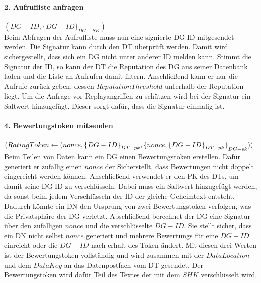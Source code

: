 \documentclass[
	fontsize=11pt,
	headings=small,
	parskip=half,           %
	bibliography=totoc,
	numbers=noenddot,       %
	open=any,               %
]{scrreprt}
\begin{document}
\paragraph{2. Aufrufliste anfragen} $(DG-ID, {\{DG-ID\}}_{DG-SK})$\\
Beim Abfragen der Aufrufliste muss nun eine signierte DG ID mitgesendet werden. Die Signatur kann durch den DT überprüft werden. Damit wird sichergestellt, dass sich ein DG nicht unter anderer ID melden kann. Stimmt die Signatur der ID, so kann der DT die Reputation des DG aus seiner Datenbank laden und die Liste an Aufrufen damit filtern. Anschließend kann er nur die Aufrufe zurück geben, dessen $ReputationThreshold$ unterhalb der Reputation liegt. Um die Anfrage vor Replayangriffen zu schützen wird bei der Signatur ein Saltwert hinzugefügt. Dieser sorgt dafür, dass die Signatur einmalig ist.

\paragraph{4. Bewertungstoken mitsenden}$(RatingToken \leftarrow (nonce, {\{DG-ID\}}_{DT-pk},\\{\{nonce, {\{DG-ID\}}_{DT-pk}\}}_{DG-sk}))$\\
Beim Teilen von Daten kann ein DG einen Bewertungstoken erstellen. Dafür generiert er zufällig einen $nonce$ der Sicherstellt, dass Bewertungen nicht doppelt eingereicht werden können. Anschließend verwendet er den PK des DTs, um damit seine DG ID zu verschlüsseln. Dabei muss ein Saltwert hinzugefügt werden, da sonst beim jedem Verschlüsseln der ID der gleiche Geheimtext entsteht. Dadurch könnte ein DN den Ursprung von zwei Bewertungstoken verfolgen, was die Privatsphäre der DG verletzt. Abschließend berechnet der DG eine Signatur über den zufälligen $nonce$ und die verschlüsselte $DG-ID$. Sie stellt sicher, dass ein DN nicht selbst $nonce$ generiert und mehrere Bewertungs für eine $DG-ID$ einreicht oder die $DG-ID$ nach erhalt des Token ändert. Mit diesen drei Werten ist der Bewertungstoken vollständig und wird zusammen mit der $DataLocation$ und dem $DataKey$ an das Datenpostfach vom DT gesendet. Der Bewertungstoken wird dafür Teil des Textes der mit dem $SHK$ verschlüsselt wird.
\end{document}
